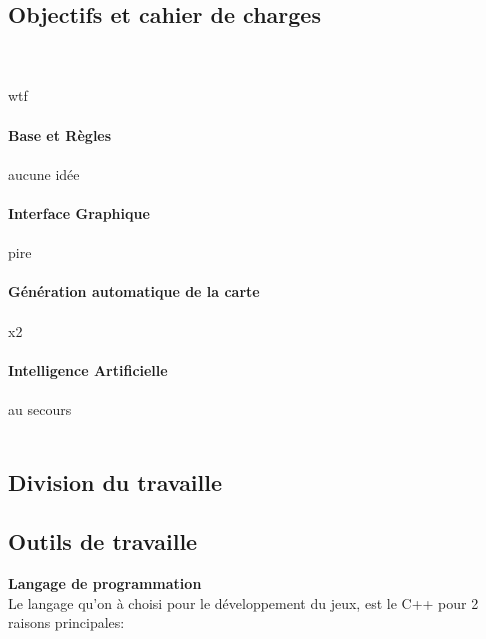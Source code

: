 \documentclass{article}
\begin{document}
\subsection{Objectifs et cahier de charges}
~\\~\\
wtf
\\~\\
\textbf{\large Base et Règles}
\\~\\
aucune idée 
\\~\\
\textbf{\large Interface Graphique}
\\~\\
pire
\\~\\
\textbf{\large Génération automatique de la carte}
\\~\\
x2
\\~\\
\textbf{\large Intelligence Artificielle}
\\~\\
au secours
\\~\\
\newpage
\subsection{Division du travaille}
\newpage
\subsection{Outils de travaille}
\textbf{\large Langage de programmation}\\
Le langage qu'on à choisi pour le développement du jeux, est le C++ pour 2 raisons principales:
\end{document}
